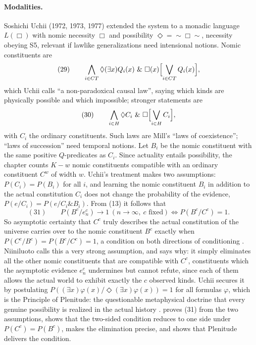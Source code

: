 \paragraph{Modalities.} Soshichi Uchii (1972, 1973, 1977) extended the
system to a monadic language \(L(\Box)\) with nomic necessity \(\Box\) and
possibility \(\Diamond=\sim\Box\sim\), necessity obeying S5, relevant if
lawlike generalizations need intensional notions. Nomic constituents are
\[
 (29)\qquad \bigwedge_{i\in CT}\Diamond(\exists x)Q_i(x)\ \&\ \Box(x)\Bigl[\bigvee_{i\in CT}Q_i(x)\Bigr],
\]
which Uchii calls ``a non-paradoxical causal law'', saying which kinds are
physically possible and which impossible; stronger statements are
\[
 (30)\qquad \bigwedge_{i\in H}\Diamond C_i\ \&\ \Box\Bigl[\bigvee_{i\in H}C_i\Bigr],
\]
with \(C_i\) the ordinary constituents. Such laws are Mill's ``laws of
coexistence''; ``laws of succession'' need temporal notions. Let \(B_i\) be
the nomic constituent with the same positive \(Q\)-predicates as \(C_i\).
Since actuality entails possibility, the chapter counts \(K-w\) nomic
constituents compatible with an ordinary constituent \(C^w\) of width \(w\).
Uchii's treatment makes two assumptions: \(P(C_i)=P(B_i)\) for all \(i\), and
learning the nomic constituent \(B_i\) in addition to the actual
constitution \(C_i\) does not change the probability of the evidence,
\(P(e/C_i)=P(e/C_i\&B_i)\). From (13) it follows that
\[
 (31)\qquad P(B^c/e^c_n)\to1\ (n\to\infty,\ c\text{ fixed})\iff P(B^c/C^c)=1.
\]
So asymptotic certainty that \(C^c\) truly describes the actual constitution
of the universe carries over to the nomic constituent \(B^c\) exactly when
\(P(C^c/B^c)=P(B^c/C^c)=1\), a condition on both directions of conditioning
\cite[p.~329]{Niiniluoto2011HintikkaProgramReading}.
Niiniluoto calls this a very strong assumption, and says why: it simply
eliminates all the other nomic constituents that are compatible with
\(C^c\), constituents which the asymptotic evidence \(e^c_n\) undermines but
cannot refute, since each of them allows the actual world to exhibit
exactly the \(c\) observed kinds. Uchii secures it by postulating
\(P((\exists x)\varphi(x)/\Diamond(\exists x)\varphi(x))=1\) for all formulas
\(\varphi\), which is the Principle of Plenitude: the questionable
metaphysical doctrine that every genuine possibility is realized in the
actual history \cite[p.~329]{Niiniluoto2011HintikkaProgramReading}.
 proves (31) from the two assumptions, shows
that the two-sided condition reduces to one side under \(P(C^c)=P(B^c)\),
makes the elimination precise, and shows that Plenitude delivers the
condition.

